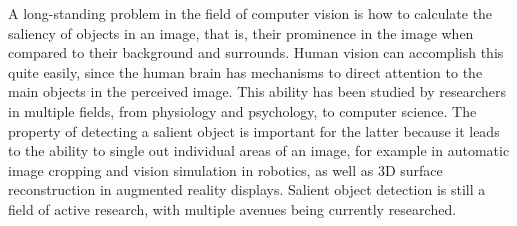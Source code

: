 \documentclass[10pt,twocolumn,letterpaper]{article}
\newcommand{\BOLD}{\textbf}
\begin{document}
A long-standing problem in the field of computer vision is how to calculate the saliency of objects in an image, that is, their prominence in the image when compared to their background and surrounds.  Human vision can accomplish this quite easily, since the human brain has mechanisms to direct attention to the main objects in the perceived image.  This ability has been studied by researchers in multiple fields, from physiology and psychology, to computer science.  The property of detecting a salient object is important for the latter because it leads to the ability to single out individual areas of an image, for example in automatic image cropping and vision simulation in robotics, as well as 3D surface reconstruction in augmented reality displays.  Salient object detection is still a field of active research, with multiple avenues being currently researched.
\end{document}
